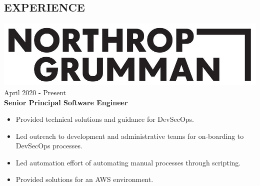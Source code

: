 \documentclass[12pt, line, margin]{res}
\begin{document}
\begin{resume}
\section{ EXPERIENCE} {\sl  \includegraphics[scale=0.115, trim=10 10 25 25]{resume_images/Northrop_Grumman-2020-black-logo.jpeg}} \hfill April 2020 - Present \\
                \textbf{Senior Principal Software Engineer} 
                 \begin{itemize}  \itemsep -2pt %
	         \item   Provided technical solutions and guidance for DevSecOps.
	         \item   Led outreach to development and administrative teams for \newline
                                on-boarding to DevSecOps processes.
                  \item   Led automation effort of automating manual processes through 
                                scripting.
                  \item   Provided solutions for an AWS environment.
                \end{itemize}



\end{resume}
\end{document}
